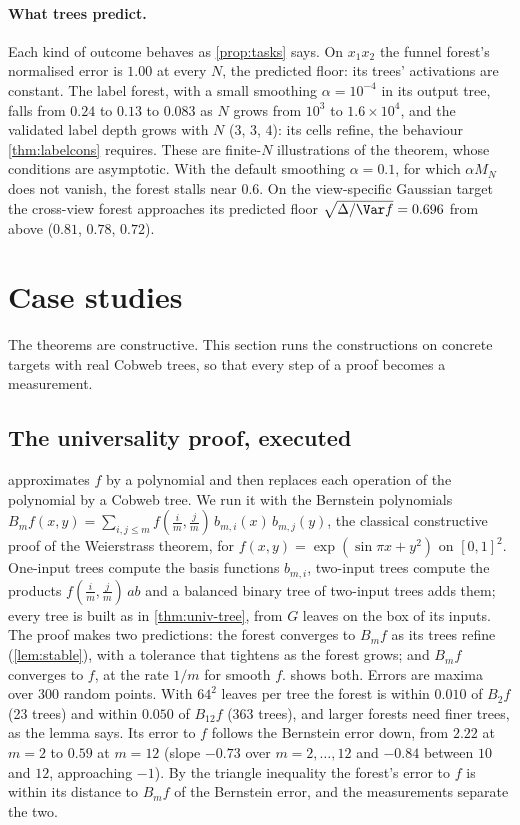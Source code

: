 \paragraph{What trees predict.}
Each kind of outcome behaves as \cref{prop:tasks} says.  On $x_1x_2$ the funnel forest's
normalised error is $1.00$ at every $N$, the predicted floor: its trees' activations are
constant.  The label forest, with a small smoothing $\alpha=10^{-4}$ in its output tree, falls from
$0.24$ to $0.13$ to $0.083$ as $N$ grows from $10^3$ to $1.6\times10^4$, and the validated label
depth grows with $N$ ($3$, $3$, $4$): its cells refine, the behaviour \cref{thm:labelcons}
requires.  These are finite-$N$ illustrations of the theorem, whose conditions are
asymptotic.  With the default smoothing $\alpha=0.1$, for which $\alpha M_N$ does not vanish,
the forest stalls near $0.6$.  On the
view-specific Gaussian target the cross-view forest approaches its predicted floor
$\sqrt{\Delta/\Var f}=0.696$ from above ($0.81$, $0.78$, $0.72$).

\section{Case studies}\label{sec:cases}

The theorems are constructive.  This section runs the constructions on concrete targets with
real Cobweb trees, so that every step of a proof becomes a measurement.

\subsection{The universality proof, executed}

 approximates $f$ by a polynomial and then replaces each operation of
the polynomial by a Cobweb tree.  We run it with the Bernstein polynomials
$B_mf(x,y)=\sum_{i,j\le m}f(\tfrac im,\tfrac jm)\,b_{m,i}(x)\,b_{m,j}(y)$, the classical constructive
proof of the Weierstrass theorem, for $f(x,y)=\exp(\sin\pi x+y^2)$ on $[0,1]^2$.  One-input trees
compute the basis functions $b_{m,i}$, two-input trees compute the products
$f(\tfrac im,\tfrac jm)\,ab$ and a balanced binary tree of two-input trees adds them; every tree is
built as in \cref{thm:univ-tree}, from $G$ leaves on the box of its inputs.  The proof makes
two predictions: the forest converges to $B_mf$ as its trees refine (\cref{lem:stable}), with
a tolerance that tightens as the forest grows; and $B_mf$ converges to $f$, at the rate $1/m$
for smooth $f$.   shows both.  Errors are maxima over 300 random points.  With $64^2$ leaves per tree
the forest is within $0.010$ of $B_2f$ (23 trees) and within $0.050$ of $B_{12}f$ (363 trees), and
larger forests need finer trees, as the lemma says.  Its error to $f$ follows the Bernstein
error down, from $2.22$ at $m=2$ to $0.59$ at $m=12$ (slope $-0.73$ over $m=2,\dots,12$ and $-0.84$
between $10$ and $12$, approaching $-1$).  By the triangle inequality the forest's error to $f$
is within its distance to $B_mf$ of the Bernstein error, and the measurements separate the
two.

